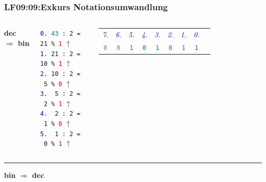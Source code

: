 \begin{frame}[fragile]  
  \frametitle{LF09:09:Exkurs Notationsumwandlung}
  \begin{footnotesize}
  \begin{columns}
    \textbf{dec $\Rightarrow$ bin}
  
    \vspace{0.2cm}
    \texttt{\textcolor{blue}{\tiny{0.}} \textcolor{teal}{43} : 2 = 21 \% \textcolor{red}{1}} $\uparrow$\\
    \texttt{\textcolor{blue}{\tiny{1.}} 21 : 2 = 10 \% \textcolor{red}{1}} $\uparrow$\\
    \texttt{\textcolor{blue}{\tiny{2.}} 10 : 2 = \ 5 \% \textcolor{red}{0}} $\uparrow$\\
    \texttt{\textcolor{blue}{\tiny{3.}} \ 5 : 2 = \ 2 \% \textcolor{red}{1}} $\uparrow$\\
    \texttt{\textcolor{blue}{\tiny{4.}} \ 2 : 2 = \ 1 \% \textcolor{red}{0}} $\uparrow$\\
    \texttt{\textcolor{blue}{\tiny{5.}} \ 1 : 2 = \ 0 \% \textcolor{red}{1}} $\uparrow$ \\

    
    \renewcommand{\arraystretch}{1.5}
    \begin{tabular}{c c c c c c c c c}
    \textit{\textcolor{blue}{7.}} &\textit{\textcolor{blue}{6.}} &
      \textit{\textcolor{blue}{5.}} & \textit{\textcolor{blue}{4.}} &
        \textit{\textcolor{blue}{3.}} & \textit{\textcolor{blue}{2.}} &
          \textit{\textcolor{blue}{1.}} & \textit{\textcolor{blue}{0.}} & \\
      \texttt{\textcolor{gray}{0}} & \texttt{\textcolor{gray}{0}} & \texttt{\textcolor{teal}{1}} & \texttt{\textcolor{teal}{0}} & 
        \texttt{\textcolor{teal}{1}} & \texttt{\textcolor{teal}{0}} & \texttt{\textcolor{teal}{1}} & \texttt{\textcolor{teal}{1}} & \\
   \end{tabular}
  \end{columns}

  \vspace{0.6cm}
  \rule{0.9\textwidth}{0.5pt}
  
  \vspace{0.6cm}

  \textbf{bin $\Rightarrow$ dec}
  
  \vspace{0.2cm}


\end{footnotesize}
\end{frame}

